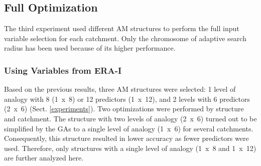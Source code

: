 \documentclass[draft]{agujournal2019}
\begin{document}
\FloatBarrier

\subsection{Full Optimization}
\label{best_multi}

The third experiment used different AM structures to perform the full input variable selection for each catchment. Only the chromosome of adaptive search radius has been used because of its higher performance.

\subsubsection{Using Variables from ERA-I}

Based on the previous results, three AM structures were selected: 1 level of analogy with 8 (1~x~8) or 12 predictors (1~x~12), and 2 levels with 6 predictors (2~x~6) (Sect. \ref{experiments}). Two optimizations were performed by structure and catchment. The structure with two levels of analogy (2~x~6) turned out to be simplified by the GAs to a single level of analogy (1~x~6) for several catchments. Consequently, this structure resulted in lower accuracy as fewer predictors were used. Therefore, only structures with a single level of analogy (1~x~8 and 1~x~12) are further analyzed here. 
\end{document}
